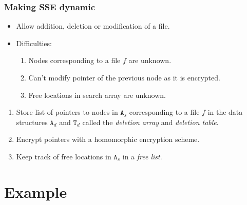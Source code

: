 \documentclass{beamer}
\begin{document}
\begin{frame}[allowframebreaks]
\frametitle{Making SSE dynamic}
\begin{itemize}
\item Allow addition, deletion or modification of a file.
\item Difficulties:

\begin{enumerate}
\item Nodes corresponding to a file \(f\) are unknown.
\item Can't modify pointer of the previous node as it is encrypted.
\item Free locations in search array are unknown.
\end{enumerate}

\end{itemize}

\framebreak
\begin{enumerate}
\item Store list of pointers to nodes in \(\mathtt{A}_s\)
	corresponding to a file \(f\) in the
	data structures \(\mathtt{A}_d\) and \(\mathtt{T}_d\)
	called the \emph{deletion array} and \emph{deletion table}.
\item Encrypt pointers with a homomorphic encryption scheme.
\item Keep track of free locations in \(\mathtt{A}_s\) in a \emph{free list}.
\end{enumerate}
\end{frame}

\section{Example}
\end{document}
